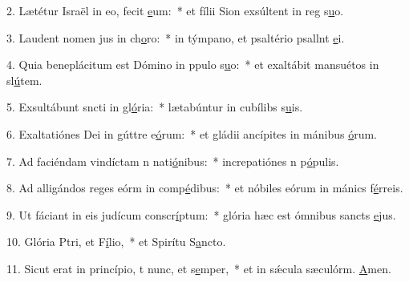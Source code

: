 2. Lætétur Israël in eo,  fecit \uline{e}um:~* et fílii Sion exsúltent in reg s\uline{u}o.\par 
3. Laudent nomen jus in ch\uline{o}ro:~* in týmpano, et psaltério psallnt \uline{e}i.\par 
4. Quia beneplácitum est Dómino in ppulo s\uline{u}o:~* et exaltábit mansuétos in sl\uline{ú}tem.\par 
5. Exsultábunt sncti in gl\uline{ó}ria:~* lætabúntur in cubílibs s\uline{u}is.\par 
6. Exaltatiónes Dei in gúttre e\uline{ó}rum:~* et gládii ancípites in mánibus \uline{ó}rum.\par 
7. Ad faciéndam vindíctam n nati\uline{ó}nibus:~* increpatiónes n p\uline{ó}pulis.\par 
8. Ad alligándos reges eórm in comp\uline{é}dibus:~* et nóbiles eórum in mánics f\uline{é}rreis.\par 
9. Ut fáciant in eis judícum conscr\uline{í}ptum:~* glória hæc est ómnibus sancts \uline{e}jus.\par 
10. Glória Ptri, et F\uline{í}lio,~* et Spirítu S\uline{a}ncto.\par 
11. Sicut erat in princípio, t nunc, et s\uline{e}mper,~* et in sǽcula sæculórm. \uline{A}men.\par 
